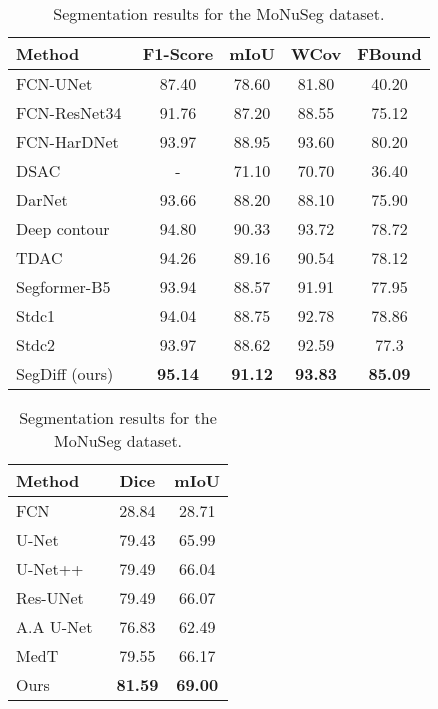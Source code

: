 \documentclass[10pt,twocolumn,letterpaper]{article}
\begin{document}
\begin{table}[t]
\centering
\begin{tabular}{@{}l@{~}cccc@{}}
\hline
Method & F1-Score & mIoU & WCov & FBound \\
\hline
FCN-UNet~\cite{ronneberger2015u}
& 87.40 & 78.60 & 81.80 & 40.20 \\
FCN-ResNet34
& 91.76 & 87.20 & 88.55 & 75.12\\
FCN-HarDNet~\cite{chao2019hardnet}
& 93.97 & 88.95 & 93.60 & 80.20\\
DSAC~\cite{marcos2018learning}
& - & 71.10 & 70.70 & 36.40 \\
DarNet~\cite{cheng2019darnet}
& 93.66 & 88.20 & 88.10 & 75.90 \\
Deep contour~\cite{gur2019end}
& 94.80 & 90.33 & 93.72 & 78.72 \\
TDAC~\cite{hatamizadeh2020end}
& 94.26 & 89.16 & 90.54 & 78.12 \\
Segformer-B5~\cite{xie2021segformer}
& 93.94 & 88.57 & 91.91 & 77.95 \\
Stdc1~\cite{fan2021rethinking}
& 94.04 & 88.75 & 92.78 & 78.86 \\
Stdc2~\cite{fan2021rethinking}
& 93.97 & 88.62 & 92.59 & 77.3 \\
SegDiff (ours)
& \textbf{95.14} & \textbf{91.12} & \textbf{93.83} & \textbf{85.09}\\
\hline
\end{tabular}
\vspace{1mm}
\caption{Segmentation results for the Vaihingen dataset.}
\label{tab:vaihingen}

\begin{tabular}{lcc}
\toprule
Method & Dice & mIoU \\
\midrule
FCN~\cite{badrinarayanan2017segnet} & 28.84 &  28.71 \\
U-Net~\cite{ronneberger2015u} & 79.43 & 65.99 \\
U-Net++~\cite{zhou2018unet++} & 79.49 & 66.04 \\
Res-UNet~\cite{xiao2018weighted} & 79.49 & 66.07 \\
A.A U-Net~\cite{wang2020axial} & 76.83 & 62.49 \\
MedT~\cite{valanarasu2021medical} & 79.55 & 66.17 \\
Ours & {\bf 81.59} & {\bf 69.00} \\
\bottomrule
\end{tabular}
\vspace{1mm}
\caption{Segmentation results for the MoNuSeg dataset.}
\label{tab:Monu}
\vspace{-6mm}
\end{table}
\end{document}
